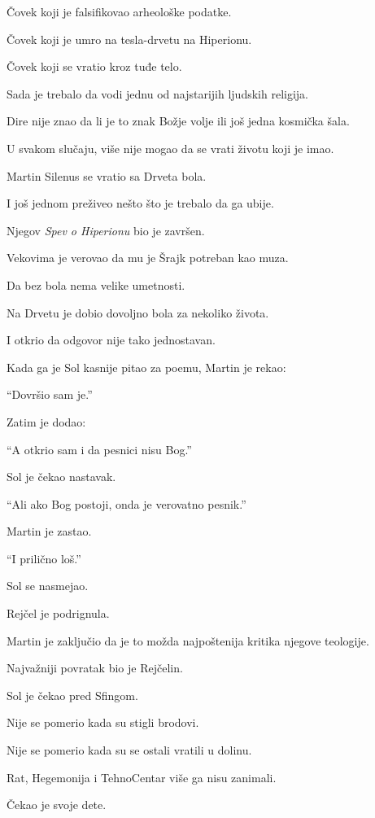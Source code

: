 Čovek koji je falsifikovao arheološke podatke.

Čovek koji je umro na tesla-drvetu na Hiperionu.

Čovek koji se vratio kroz tuđe telo.

Sada je trebalo da vodi jednu od najstarijih ljudskih religija.

Dire nije znao da li je to znak Božje volje ili još jedna kosmička šala.

U svakom slučaju, više nije mogao da se vrati životu koji je imao.

\bigskip

Martin Silenus se vratio sa Drveta bola.

I još jednom preživeo nešto što je trebalo da ga ubije.

Njegov \emph{Spev o Hiperionu} bio je završen.

Vekovima je verovao da mu je Šrajk potreban kao muza.

Da bez bola nema velike umetnosti.

Na Drvetu je dobio dovoljno bola za nekoliko života.

I otkrio da odgovor nije tako jednostavan.

Kada ga je Sol kasnije pitao za poemu, Martin je rekao:

``Dovršio sam je.''

Zatim je dodao:

``A otkrio sam i da pesnici nisu Bog.''

Sol je čekao nastavak.

``Ali ako Bog postoji, onda je verovatno pesnik.''

Martin je zastao.

``I prilično loš.''

Sol se nasmejao.

Rejčel je podrignula.

Martin je zaključio da je to možda najpoštenija kritika njegove teologije.

\bigskip

Najvažniji povratak bio je Rejčelin.

Sol je čekao pred Sfingom.

Nije se pomerio kada su stigli brodovi.

Nije se pomerio kada su se ostali vratili u dolinu.

Rat, Hegemonija i TehnoCentar više ga nisu zanimali.

Čekao je svoje dete.

\bigskip

